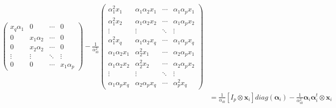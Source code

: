 \documentclass{article}
\begin{document}
\begin{align*}
\begin{pmatrix}
x_q\alpha_1 & 0 & \cdots & 0 \\
0 & x_1 \alpha_2 & \cdots & 0 \\
0 & x_2 \alpha_2 & \cdots & 0 \\
\vdots & \vdots & \ddots & \vdots \\
0 & 0 & \cdots & x_1 \alpha_p
\end{pmatrix} - \frac{1}{\alpha_{i0}^2}\begin{pmatrix} \alpha_1^2 x_1 & \alpha_1\alpha_2 x_1 & \cdots & \alpha_1\alpha_p x_1 \\
\alpha_1^2 x_2 &\alpha_1\alpha_2 x_2 & \cdots &  \alpha_1\alpha_p x_2\\
\vdots & \vdots &\ddots & \vdots \\
\alpha_1^2 x_q & \alpha_1\alpha_2 x_q & \cdots & \alpha_1 \alpha_p x_q\\
\alpha_1\alpha_2x_1 & \alpha_2^2  x_1 & \cdots & \alpha_2 \alpha_p x_1 \\
\alpha_1\alpha_2x_2 & \alpha_2^2  x_2 & \cdots & \alpha_2 \alpha_p x_2\\
\vdots & \vdots & \ddots &\vdots \\
\alpha_1\alpha_p x_q & \alpha_2\alpha_p x_q & \cdots & \alpha_p^2 x_q\end{pmatrix}\\
&= \frac{1}{\alpha_{i0}}[I_p \otimes \mathbf{x}_i] diag(\boldsymbol\alpha_i) - \frac{1}{\alpha_{i0}^2} \boldsymbol\alpha_i \boldsymbol\alpha_i^t \otimes \mathbf{x}_i

\end{align*}
\end{document}
